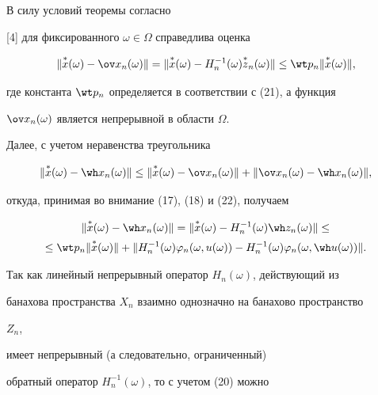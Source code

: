 \begin{pf} В силу условий теоремы согласно


[4] для фиксированного $\omega\in\Omega$ справедлива оценка


\begin{equation}


\|\up{*}{x}(\omega)-\ov x_n(\omega)\|=


\|\up{*}{x}(\omega)-H^{-1}_n(\omega)\up{*}{z}_n(\omega)\|\le


\wt p_n\|\up{*}{x}(\omega)\|,


\end{equation}


где константа $\wt p_n$ определяется в соответствии с (21), а функция


$\ov x_n(\omega)$ является непрерывной в области $\Omega$.


Далее, с учетом неравенства треугольника


$$


\|\up{*}{x}(\omega)-\wh x_n(\omega)\|\le


\|\up{*}{x}(\omega)-\ov x_n(\omega)\|+


\|\ov x_n(\omega)-\wh x_n(\omega)\|,


$$


откуда, принимая во внимание (17), (18) и (22), получаем


\begin{multline}


\|\up{*}{x}(\omega)-\wh x_n(\omega)\|=


\|\up{*}{x}(\omega)-H^{-1}_n(\omega)\wh z_n(\omega)\|\le \\


%


\le \wt p_n\|\up{*}{x}(\omega)\|+


\|H^{-1}_n(\omega)\varphi_n(\omega,u(\omega))-


H^{-1}_n(\omega)\varphi_n(\omega,\wh u(\omega))\|.


\end{multline}





Так как линейный непрерывный оператор $H_n(\omega)$, действующий из


банахова пространства $X_n$ взаимно однозначно на банахово пространство


$Z_n$,


имеет непрерывный (а следовательно, ограниченный)


обратный оператор $H^{-1}_n(\omega)$, то с учетом (20) можно



\end{pf}
